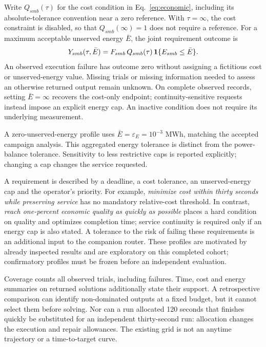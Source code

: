 Write $Q_{smb}(\tau)$ for the cost condition in Eq.~\eqref{eq:economic},
including its absolute-tolerance convention near a zero reference. With
$\tau=\infty$, the cost constraint is disabled, so that $Q_{smb}(\infty)=1$
does not require a reference. For a maximum acceptable unserved energy
$\bar E$, the joint requirement outcome is
\begin{equation}
 Y_{smb}(\tau,\bar E)
 =F_{smb}\,Q_{smb}(\tau)\,\mathbf{1}\{E_{smb}\leq\bar E\}.
 \label{eq:service}
\end{equation}
An observed execution failure has outcome zero without assigning a fictitious
cost or unserved-energy value. Missing trials or missing information needed
to assess an otherwise returned output remain unknown. On complete observed records, setting
$\bar E=\infty$ recovers the cost-only endpoint; continuity-sensitive requests
instead impose an explicit energy cap. An inactive condition does not require
its underlying measurement.

A zero-unserved-energy profile uses $\bar E=\varepsilon_E=10^{-3}$ MWh,
matching the accepted campaign analysis. This aggregated energy tolerance is
distinct from the power-balance tolerance. Sensitivity to less restrictive
caps is reported explicitly; changing a cap changes the service requested.

A requirement is described by a deadline, a cost tolerance, an unserved-energy
cap and the operator's priority. For example, \emph{minimize cost within thirty
seconds while preserving service} has no mandatory relative-cost threshold.
In contrast, \emph{reach one-percent economic quality as quickly as possible}
places a hard condition on quality and optimizes completion time; service
continuity is required only if an energy cap is also stated. A tolerance to
the risk of failing these requirements is an additional input to the companion
router. These profiles are motivated by already inspected results and are
exploratory on this completed cohort; confirmatory profiles must be frozen before an
independent evaluation.

Coverage counts all observed trials, including failures. Time, cost and energy
summaries on returned solutions additionally state their support. A
retrospective comparison can identify non-dominated outputs at a fixed budget,
but it cannot select them before solving. Nor can a run allocated 120 seconds
that finishes quickly be substituted for an independent thirty-second run:
allocation changes the execution and repair allowances. The existing grid is
not an anytime trajectory or a time-to-target curve.

